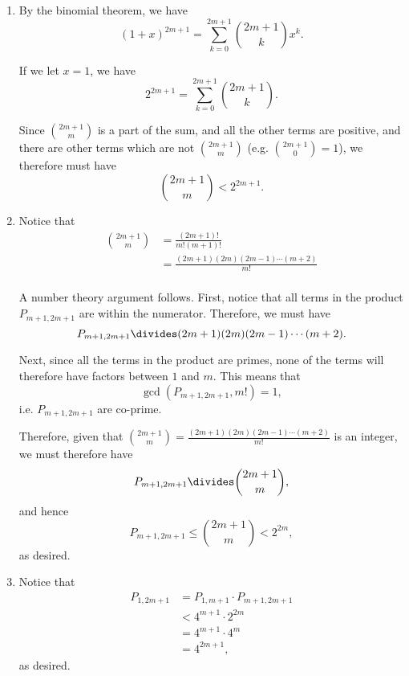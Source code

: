 \Question{\currfilebase}

\begin{enumerate}
    \item By the binomial theorem, we have
          \[
              (1 + x)^{2m + 1} = \sum_{k = 0}^{2m + 1} \binom{2m + 1}{k} x^k.
          \]

          If we let \(x = 1\), we have
          \[
              2^{2m + 1} = \sum_{k = 0}^{2m + 1} \binom{2m + 1}{k}.
          \]

          Since \(\binom{2m + 1}{m}\) is a part of the sum, and all the other terms are positive, and there are other terms which are not \(\binom{2m + 1}{m}\) (e.g. \(\binom{2m + 1}{0} = 1\)), we therefore must have
          \[
              \binom{2m + 1}{m} < 2^{2m + 1}.
          \]

    \item Notice that
          \begin{align*}
              \binom{2m + 1}{m} & = \frac{(2m + 1)!}{m! (m + 1)!}                  \\
                                & = \frac{(2m + 1)(2m)(2m - 1) \cdots (m + 2)}{m!} \\
          \end{align*}

          A number theory argument follows. First, notice that all terms in the product \(P_{m + 1, 2m + 1}\) are within the numerator. Therefore, we must have
          \[
              P_{m + 1, 2m + 1} \divides (2m + 1)(2m)(2m - 1) \cdots (m + 2).
          \]

          Next, since all the terms in the product are primes, none of the terms will therefore have factors between \(1\) and \(m\). This means that
          \[
              \gcd\left(P_{m + 1, 2m + 1}, m!\right) = 1,
          \]
          i.e. \(P_{m + 1, 2m + 1}\) are co-prime.

          Therefore, given that \(\binom{2m + 1}{m} = \frac{(2m + 1)(2m)(2m - 1) \cdots (m + 2)}{m!}\) is an integer, we must therefore have
          \[
              P_{m + 1, 2m + 1} \divides \binom{2m + 1}{m},
          \]
          and hence
          \[
              P_{m + 1, 2m + 1} \leq \binom{2m + 1}{m} < 2^{2m},
          \]
          as desired.

    \item Notice that
          \begin{align*}
              P_{1, 2m + 1} & = P_{1, m + 1} \cdot P_{m + 1, 2m + 1} \\
                            & < 4^{m + 1} \cdot 2^{2m}               \\
                            & = 4^{m + 1} \cdot 4^m                  \\
                            & = 4^{2m + 1},
          \end{align*}
          as desired.


\end{enumerate}
